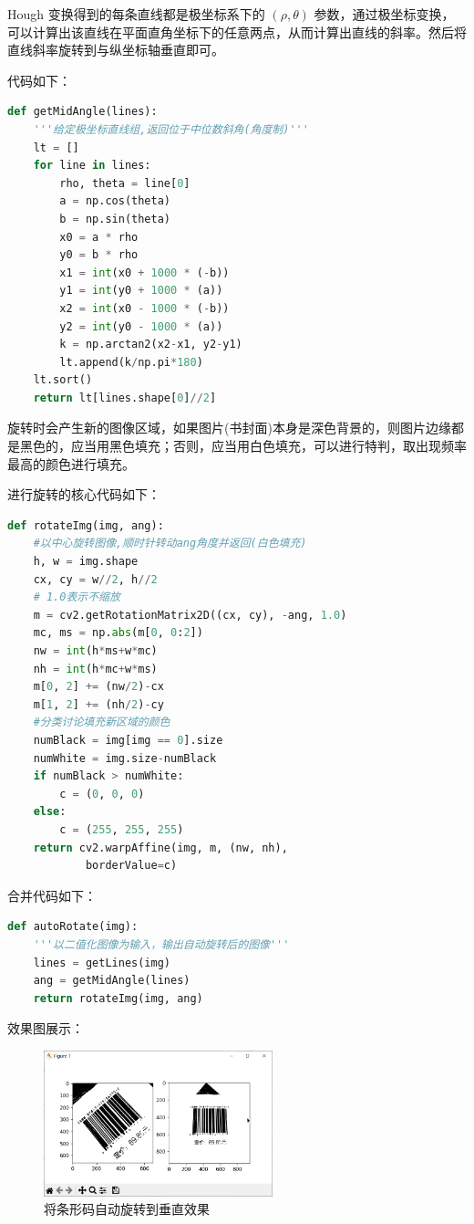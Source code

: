 \documentclass{ctexart}
\begin{document}
Hough 变换得到的每条直线都是极坐标系下的 $(\rho,\theta)$ 参数，通过极坐标变换，可以计算出该直线在平面直角坐标下的任意两点，从而计算出直线的斜率。然后将直线斜率旋转到与纵坐标轴垂直即可。

代码如下：
\begin{lstlisting}[language=python]
def getMidAngle(lines):
    '''给定极坐标直线组,返回位于中位数斜角(角度制)'''
    lt = []
    for line in lines:
        rho, theta = line[0]
        a = np.cos(theta)
        b = np.sin(theta)
        x0 = a * rho
        y0 = b * rho
        x1 = int(x0 + 1000 * (-b))
        y1 = int(y0 + 1000 * (a))
        x2 = int(x0 - 1000 * (-b))
        y2 = int(y0 - 1000 * (a))
        k = np.arctan2(x2-x1, y2-y1)
        lt.append(k/np.pi*180)
    lt.sort()
    return lt[lines.shape[0]//2]
\end{lstlisting}

旋转时会产生新的图像区域，如果图片(书封面)本身是深色背景的，则图片边缘都是黑色的，应当用黑色填充；否则，应当用白色填充，可以进行特判，取出现频率最高的颜色进行填充。

进行旋转的核心代码如下：
\begin{lstlisting}[language=python]
def rotateImg(img, ang):
    #以中心旋转图像,顺时针转动ang角度并返回(白色填充)
    h, w = img.shape
    cx, cy = w//2, h//2
    # 1.0表示不缩放
    m = cv2.getRotationMatrix2D((cx, cy), -ang, 1.0)
    mc, ms = np.abs(m[0, 0:2])
    nw = int(h*ms+w*mc)
    nh = int(h*mc+w*ms)
    m[0, 2] += (nw/2)-cx
    m[1, 2] += (nh/2)-cy
    #分类讨论填充新区域的颜色
    numBlack = img[img == 0].size
    numWhite = img.size-numBlack
    if numBlack > numWhite:
        c = (0, 0, 0)
    else:
        c = (255, 255, 255)
    return cv2.warpAffine(img, m, (nw, nh),
            borderValue=c)
\end{lstlisting}

合并代码如下：
\begin{lstlisting}[language=python]
def autoRotate(img):
    '''以二值化图像为输入，输出自动旋转后的图像'''
    lines = getLines(img)
    ang = getMidAngle(lines)
    return rotateImg(img, ang)
\end{lstlisting}

效果图展示：
\begin{figure}[H]
    \centering
    \includegraphics[height=120pt]{sample_autoRotate}
    \caption{将条形码自动旋转到垂直效果}
\end{figure}
\end{document}
